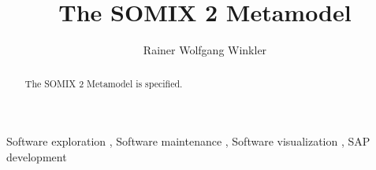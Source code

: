 \documentclass[preprint,12pt]{elsarticle}
\begin{document}
\begin{frontmatter}



\title{The SOMIX 2 Metamodel}


\author[1]{Rainer Wolfgang Winkler%
}
\address[1]{CubeServ GmbH, Am Prime-Parc 4, 65479 Raunheim, Germany}



\begin{abstract}

The SOMIX 2 Metamodel is specified.

\end{abstract}


\begin{keyword}

Software exploration \sep
Software maintenance \sep
Software visualization \sep
SAP development



\end{keyword}

\end{frontmatter}
\end{document}
